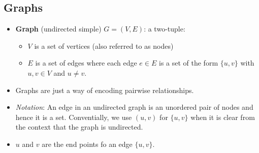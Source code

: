 \documentclass[12pt]{article}
\begin{document}
\subsection{Graphs}
\begin{itemize}
    \item \textbf{Graph} (undirected simple) $G = (V, E)$: a two-tuple:
    \begin{itemize}
        \item $V$ is a set of vertices (also referred to as nodes)
        \item $E$ is a set of edges where each edge $e \in E$ is a set of the form $\{ u, v \}$ with $u, v \in V$ and $u \neq v$.
    \end{itemize}
    \item Graphs are just a way of encoding pairwise relationships.
    \item \textit{Notation}: An edge in an undirected graph is an unordered pair of nodes and hence it is a set. Conventially, we use $(u, v)$ for $\{ u, v \}$ when it is clear from the context that the graph is undirected.
    \item $u$ and $v$ are the end points fo an edge $\{ u, v \}$.
\end{itemize}
\end{document}
